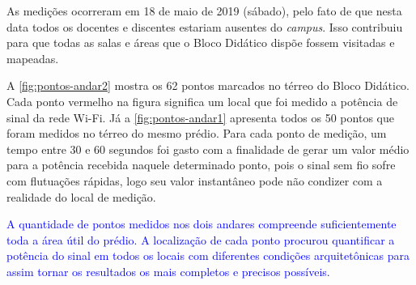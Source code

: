 As medições ocorreram em 18 de maio de 2019 (sábado), pelo fato de que nesta data todos os docentes e discentes estariam ausentes do \textit{campus}. Isso contribuiu para que todas as salas e áreas que o Bloco Didático dispõe fossem visitadas e mapeadas.

A \autoref{fig:pontos-andar2} mostra os 62 pontos marcados no térreo do Bloco Didático. Cada ponto vermelho na figura significa um local que foi medido a potência de sinal da rede Wi-Fi. Já a \autoref{fig:pontos-andar1} apresenta todos os 50 pontos que foram medidos no térreo do mesmo prédio. Para cada ponto de medição, um tempo entre 30 e 60 segundos foi gasto com a finalidade de gerar um valor médio para a potência recebida naquele determinado ponto, pois o sinal sem fio sofre com flutuações rápidas, logo seu valor instantâneo pode não condizer com a realidade do local de medição.

\textcolor{blue}{A quantidade de pontos medidos nos dois andares compreende suficientemente toda a área útil do prédio. A localização de cada ponto procurou quantificar a potência do sinal em todos os locais com diferentes condições arquitetônicas para assim tornar os resultados os mais completos e precisos possíveis.}

\begin{figure}[H]
	\centering
\end{figure}

\begin{figure}[H]
	\centering
\end{figure}


